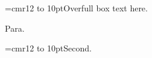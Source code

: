 \documentclass{article}
\begin{document}
\font\fa=cmr12 \fa
\hbox to 10pt{Overfull box text here.}

Para.

\font\fb=cmr12 \fb
\hbox to 10pt{Second.}
\end{document}

